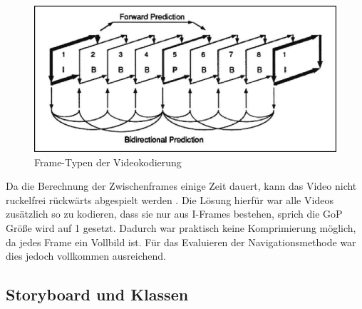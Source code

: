 \documentclass[11pt,a4paper]{report}
\begin{document}
\begin{figure}[h]
\begin{center}
\includegraphics[scale=1.1]{./images/25.png}
\caption{Frame-Typen der Videokodierung \cite{wu2005guidelines}}
\label{gop_frames}
\end{center}
\end{figure}
Da die Berechnung der Zwischenframes einige Zeit dauert, kann das Video nicht ruckelfrei rückwärts abgespielt werden \cite{le1991mpeg}. Die Lösung hierfür war alle Videos zusätzlich so zu kodieren, dass sie nur aus I-Frames bestehen, sprich die GoP Größe wird auf 1 gesetzt. Dadurch war praktisch keine Komprimierung möglich, da jedes Frame ein Vollbild ist. Für das Evaluieren der Navigationsmethode war dies jedoch vollkommen ausreichend.

\subsection{Storyboard und Klassen}
\end{document}
